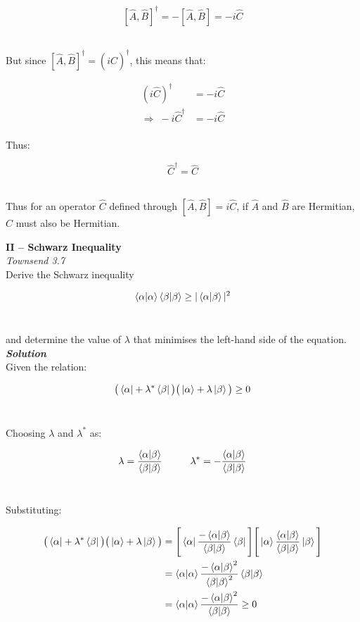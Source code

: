\documentclass[9pt]{extarticle}
\newcommand{\bfit}[1]{\textbf{\textit{#1}}}
\begin{document}
\begin{multicols*}{2}
$$[\hat A, \hat B]^\dagger = -[\hat A, \hat B] = -i \hat C$$ \

But since $[\hat A, \hat B]^\dagger = (i\hat C)^\dagger$, this means that:

$$
\begin{aligned}
	(i\hat C)^\dagger &= -i \hat C \\ 
	\Longrightarrow \; -i \hat C^\dagger &= -i \hat C \\ 	
\end{aligned}	
$$

Thus:

$$\hat C^\dagger = \hat C$$ \ 

Thus for an operator $\hat C$ defined through $[\hat A, \hat B] = i \hat C$, if $\hat A$ and $\hat B$ are Hermitian, $\hat C$ must also be Hermitian. \\ 





\hrulefill 

\hfill 

{\bf \LARGE II -- Schwarz Inequality} \\ 

{\it Townsend 3.7} \\
Derive the Schwarz inequality

$$\bra{\alpha}\ket{\alpha} \bra{\beta}\ket{\beta} \geq | \bra{\alpha}\ket{\beta} |^2$$ \ 

and determine the value of $\lambda$ that minimises the left-hand side of the equation. \\ 

{\bfit{Solution}} \\ 
Given the relation:

$$\big( \bra{\alpha} + \lambda^* \bra{\beta} \big) \big(  \ket{\alpha} + \lambda \ket{\beta} \big) \geq 0$$ \ 

Choosing $\lambda$ and $\lambda^*$ as:

$$\lambda = \frac{\bra{\alpha}\ket{\beta}}{\bra{\beta}\ket{\beta}} \hspace{1cm} \lambda^* = -\frac{\bra{\alpha}\ket{\beta}}{\bra{\beta}\ket{\beta}}$$ \ 

Substituting:

$$
\begin{aligned}
	\big( \bra{\alpha} + \lambda^* \bra{\beta} \big) \big(  \ket{\alpha} + \lambda \ket{\beta} \big) &= \Bigg[ \bra{\alpha} \frac{-\bra{\alpha}\ket{\beta}}{\bra{\beta}\ket{\beta}} \bra{\beta} \Bigg] \Bigg[ \ket{\alpha} \frac{\bra{\alpha}\ket{\beta}}{\bra{\beta}\ket{\beta}} \ket{\beta} \Bigg] \\ 
	&= \bra{\alpha}\ket{\alpha} \frac{-\bra{\alpha}\ket{\beta}^2}{\bra{\beta}\ket{\beta}^2} \bra{\beta}\ket{\beta} \\ 
	&= \bra{\alpha}\ket{\alpha} \frac{-\bra{\alpha}\ket{\beta}^2}{\bra{\beta}\ket{\beta}} \geq 0
\end{aligned}
$$ \ 


\end{multicols*}
\end{document}
